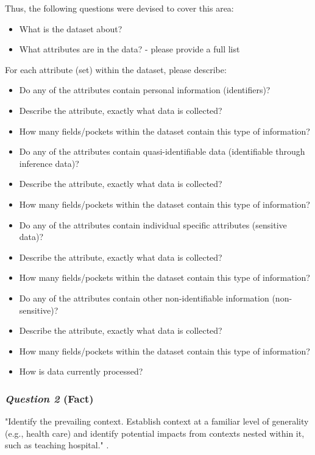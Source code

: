 Thus, the following questions were devised to cover this area:\\
\begin{itemize}

\item What is the dataset about?
\item What attributes are in the data? - please provide a full list\\

\end{itemize}
For each attribute (set) within the dataset, please describe:\\

\begin{itemize}
\item Do any of the attributes contain personal information (identifiers)?
\item Describe the attribute, exactly what data is collected?
\item How many fields/pockets within the dataset contain this type of information?
\item Do any of the attributes contain quasi-identifiable data (identifiable through inference data)?
\item Describe the attribute, exactly what data is collected?
\item How many fields/pockets within the dataset contain this type of information?
\item Do any of the attributes contain individual specific attributes (sensitive data)?
\item Describe the attribute, exactly what data is collected?
\item How many fields/pockets within the dataset contain this type of information?
\item Do any of the attributes contain other non-identifiable information (non-sensitive)?
\item Describe the attribute, exactly what data is collected?
\item How many fields/pockets within the dataset contain this type of information?
\item How is data currently processed?

\end{itemize}

\subsubsection {{\it Question 2} {\bf(Fact)}} 
"Identify the prevailing context. Establish context at a familiar level of generality (e.g., health care) and identify potential impacts from contexts nested within it, such as teaching hospital." \cite{Nissenbaum_2010}.\\

